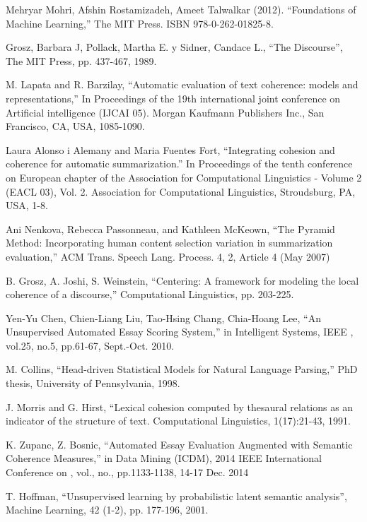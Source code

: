 \documentclass[12pt]{diicc}
\begin{document}
\begin{thebibliography} {}
	 Mehryar Mohri, Afshin Rostamizadeh, Ameet Talwalkar (2012). ``Foundations of Machine Learning,'' The MIT Press. ISBN 978-0-262-01825-8.
	
	 Grosz, Barbara J, Pollack, Martha E. y Sidner, Candace L., ``The Discourse'', The MIT
Press, pp. 437-467, 1989.

	 M. Lapata and R. Barzilay, ``Automatic evaluation of text coherence: models and representations,'' In Proceedings of the 19th international joint conference on Artificial intelligence (IJCAI 05). Morgan Kaufmann Publishers Inc., San Francisco, CA, USA, 1085-1090.
	
	 Laura Alonso i Alemany and Maria Fuentes Fort, ``Integrating cohesion and coherence for automatic summarization.'' In Proceedings of the tenth conference on European chapter of the Association for Computational Linguistics - Volume 2 (EACL 03), Vol. 2. Association for Computational Linguistics, Stroudsburg, PA, USA, 1-8. 
	
	 Ani Nenkova, Rebecca Passonneau, and Kathleen McKeown, ``The Pyramid Method: Incorporating human content selection variation in summarization evaluation,'' ACM Trans. Speech Lang. Process. 4, 2, Article 4 (May 2007)
	
	 B. Grosz, A. Joshi, S. Weinstein, ``Centering: A framework for modeling the local coherence of a discourse,'' Computational Linguistics, pp. 203-225.
	
	 Yen-Yu Chen, Chien-Liang Liu, Tao-Hsing Chang, Chia-Hoang Lee, ``An Unsupervised Automated Essay Scoring System,'' in Intelligent Systems, IEEE , vol.25, no.5, pp.61-67, Sept.-Oct. 2010.
	
	 M. Collins, ``Head-driven Statistical Models for Natural Language Parsing,'' PhD thesis, University of Pennsylvania, 1998.
	
	 J. Morris and G. Hirst, ``Lexical cohesion computed by thesaural relations as an indicator of the structure of text. Computational Linguistics, 1(17):21-43, 1991.
	
	 K. Zupanc, Z. Bosnic, ``Automated Essay Evaluation Augmented with Semantic Coherence Measures,'' in Data Mining (ICDM), 2014 IEEE International Conference on , vol., no., pp.1133-1138, 14-17 Dec. 2014
	
	 T. Hoffman, ``Unsupervised learning by probabilistic latent semantic analysis'', Machine Learning, 42 (1-2), pp. 177-196, 2001.
	

\end{thebibliography}
\end{document}
